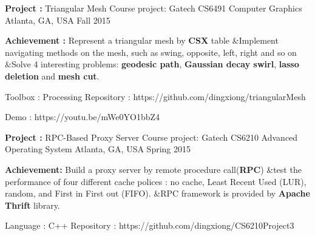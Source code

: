 


\begin{cventries}


\cventry
{\textbf{Project :} Triangular Mesh} 
{Course project: Gatech CS6491 Computer Graphics} 
{Atlanta, GA, USA} %
{Fall 2015} %
{
  \begin{cvitems}
  \item {\textbf{Achievement :} Represent a triangular mesh by \textbf{CSX} table \quad\&\quad Implement navigating
      methods on the mesh, such as swing, opposite, left, right and so on
      \quad\&\quad  Solve 4 interesting problems: \textbf{geodesic path}, 
      \textbf{Gaussian decay swirl}, \textbf{lasso deletion} and \textbf{mesh cut}.}
  \item {Toolbox : Processing \quad
      Repository : {\color{black} https://github.com/dingxiong/triangularMesh}
    \item{
      Demo :   {\color{black} https://youtu.be/mWe0YO1bbZ4}}
  }
  \end{cvitems}
}

\cventry
{\textbf{Project :} RPC-Based Proxy Server} 
{Course project: Gatech CS6210 Advanced Operating System} 
{Atlanta, GA, USA} %
{Spring 2015} %
{
  \begin{cvitems}
  \item {\textbf{Achievement:} Build a proxy server by remote procedure call(\textbf{RPC}) 
\quad\&\quad test the performance of four different cache polices : no cache, Least Recent Used (LUR), random,
      and First in First out (FIFO). 
\quad\&\quad RPC framework is provided by \textbf{Apache Thrift} library.
    }
  \item {Language : C++  \quad
      Repository : {\color{black} https://github.com/dingxiong/CS6210Project3}
    }
  \end{cvitems}
}


\end{cventries}
